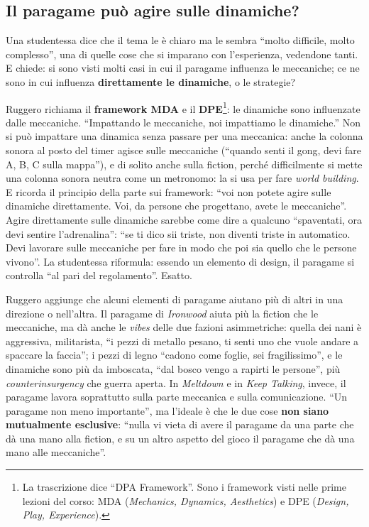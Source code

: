 \subsection{Il paragame può agire sulle dinamiche?}

Una studentessa dice che il tema le è chiaro ma le sembra ``molto difficile, molto
complesso'', una di quelle cose che si imparano con l'esperienza, vedendone tanti.
E chiede: si sono visti molti casi in cui il paragame influenza le meccaniche; ce ne sono
in cui influenza \textbf{direttamente le dinamiche}, o le strategie?

Ruggero richiama il \textbf{framework MDA} e il \textbf{DPE}\footnote{La trascrizione
dice ``DPA Framework''. Sono i framework visti nelle prime lezioni del corso: MDA
(\emph{Mechanics, Dynamics, Aesthetics}) e DPE (\emph{Design, Play, Experience}).}: le
dinamiche sono influenzate dalle meccaniche. ``Impattando le meccaniche, noi impattiamo
le dinamiche.'' Non si può impattare una dinamica senza passare per una meccanica:
anche la colonna sonora al posto del timer agisce sulle meccaniche (``quando senti il
gong, devi fare A, B, C sulla mappa''), e di solito anche sulla fiction, perché difficilmente
si mette una colonna sonora neutra come un metronomo: la si usa per fare \emph{world
building}. E ricorda il principio della parte sui framework: ``voi non potete agire sulle
dinamiche direttamente. Voi, da persone che progettano, avete le meccaniche''. Agire
direttamente sulle dinamiche sarebbe come dire a qualcuno ``spaventati, ora devi sentire
l'adrenalina'': ``se ti dico sii triste, non diventi triste in automatico. Devi lavorare
sulle meccaniche per fare in modo che poi sia quello che le persone vivono''. La
studentessa riformula: essendo un elemento di design, il paragame si controlla ``al pari
del regolamento''. Esatto.

Ruggero aggiunge che alcuni elementi di paragame aiutano più di altri in una direzione o
nell'altra. Il paragame di \emph{Ironwood} aiuta più la fiction che le meccaniche, ma
dà anche le \emph{vibes} delle due fazioni asimmetriche: quella dei nani è aggressiva,
militarista, ``i pezzi di metallo pesano, ti senti uno che vuole andare a spaccare la
faccia''; i pezzi di legno ``cadono come foglie, sei fragilissimo'', e le dinamiche sono
più da imboscata, ``dal bosco vengo a rapirti le persone'', più \emph{counterinsurgency}
che guerra aperta. In \emph{Meltdown} e in \emph{Keep Talking}, invece, il paragame lavora
soprattutto sulla parte meccanica e sulla comunicazione. ``Un paragame non meno
importante'', ma l'ideale è che le due cose \textbf{non siano mutualmente esclusive}:
``nulla vi vieta di avere il paragame da una parte che dà una mano alla fiction, e su un
altro aspetto del gioco il paragame che dà una mano alle meccaniche''.

